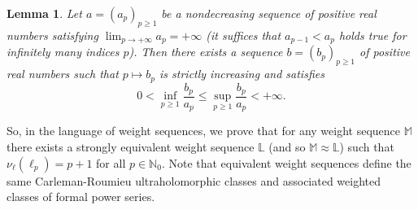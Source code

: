 \documentclass[11pt,a4paper]{article}
\theoremstyle{plain}
\newtheorem{lemma}[theo]{Lemma}
\theoremstyle{definition}
\newcommand{\N}{\mathbb{N}}
\newcommand{\M}{\mathbb{M}}
\def\L{\mathbb{L}}
\begin{document}
\begin{lemma}\label{strictincreasinglemma}
Let $a=(a_p)_{p\ge 1}$ be a nondecreasing sequence of positive real numbers satisfying $\lim_{p\rightarrow+\infty}a_p=+\infty$ (it suffices that $a_{p-1}<a_{p}$ holds true for infinitely many indices $p$). Then there exists a sequence $b=(b_p)_{p\ge 1}$ of positive real numbers such that $p\mapsto b_p$ is strictly increasing and satisfies
$$
0<\inf_{p\ge 1}\frac{b_p}{a_p}\le\sup_{p\ge 1}\frac{b_p}{a_p}<+\infty.
$$
\end{lemma}

So, in the language of weight sequences, we prove that for any weight sequence $\M$ there exists a strongly equivalent weight sequence $\L$ (and so $\M\approx\L$) such that $\nu_{\boldsymbol{\ell}}(\ell_p)=p+1$ for all $p\in\N_0$. Note that equivalent weight sequences define the same Carleman-Roumieu ultraholomorphic classes and associated weighted classes of formal power series.
\end{document}

